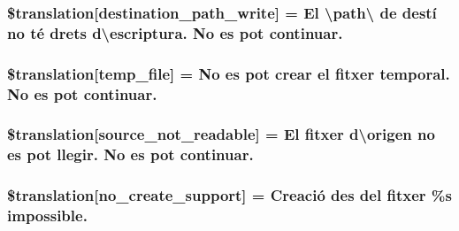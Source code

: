 \subsubsection[{\$translation}]{\setlength{\rightskip}{0pt plus 5cm}\$translation\mbox{[}\textquotesingle{}destination\+\_\+path\+\_\+write\textquotesingle{}\mbox{]} = \textquotesingle{}El \textbackslash{}\textquotesingle{}path\textbackslash{}\textquotesingle{} de destí no té drets d\textbackslash{}\textquotesingle{}escriptura. No es pot continuar.\textquotesingle{}}\label{class_8upload_8ca___c_a_8php_a40e4e1962226b89fd76da5819a9602b0}
\hypertarget{class_8upload_8ca___c_a_8php_a2baece8da11e20d45175db91851ec3e3}{}
\subsubsection[{\$translation}]{\setlength{\rightskip}{0pt plus 5cm}\$translation\mbox{[}\textquotesingle{}temp\+\_\+file\textquotesingle{}\mbox{]} = \textquotesingle{}No es pot crear el fitxer temporal. No es pot continuar.\textquotesingle{}}\label{class_8upload_8ca___c_a_8php_a2baece8da11e20d45175db91851ec3e3}
\hypertarget{class_8upload_8ca___c_a_8php_a922967ca2df0efdd455261142d8e5715}{}
\subsubsection[{\$translation}]{\setlength{\rightskip}{0pt plus 5cm}\$translation\mbox{[}\textquotesingle{}source\+\_\+not\+\_\+readable\textquotesingle{}\mbox{]} = \textquotesingle{}El fitxer d\textbackslash{}\textquotesingle{}origen no es pot llegir. No es pot continuar.\textquotesingle{}}\label{class_8upload_8ca___c_a_8php_a922967ca2df0efdd455261142d8e5715}
\hypertarget{class_8upload_8ca___c_a_8php_a346dfd1ade29f583dd20d345c436859f}{}
\subsubsection[{\$translation}]{\setlength{\rightskip}{0pt plus 5cm}\$translation\mbox{[}\textquotesingle{}no\+\_\+create\+\_\+support\textquotesingle{}\mbox{]} = \textquotesingle{}Creació des del fitxer \%s impossible.\textquotesingle{}}\label{class_8upload_8ca___c_a_8php_a346dfd1ade29f583dd20d345c436859f}
\hypertarget{class_8upload_8ca___c_a_8php_a53013ce9255c4e1849098ddd9fdb2b3f}{}
